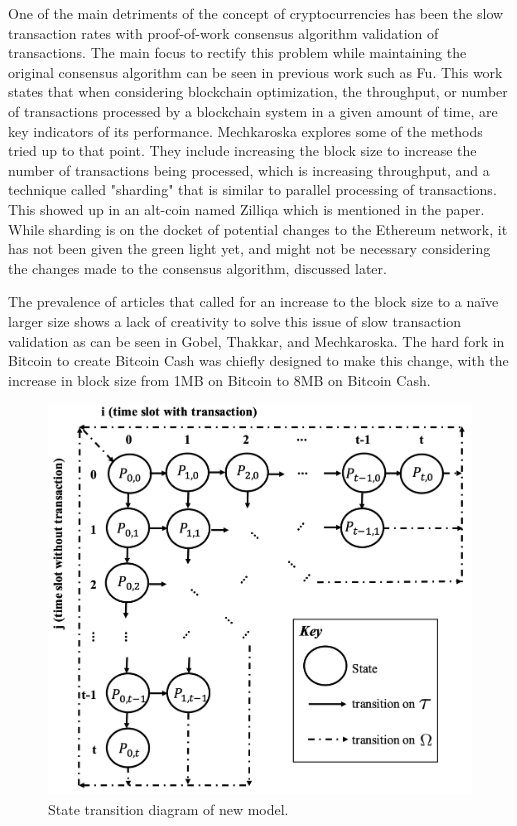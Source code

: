 \documentclass[conference]{IEEEtran}
\begin{document}
One of the main detriments of the concept of cryptocurrencies has been the slow transaction
rates with proof-of-work consensus algorithm validation of transactions. The main focus to rectify 
this problem while maintaining the original consensus algorithm can be seen in previous work such 
as Fu\cite{2020_IEEEToVT_Fu}. This work states that when considering blockchain optimization, 
the throughput, or number of transactions processed by a blockchain system in a given amount of 
time, are key indicators of its performance. Mechkaroska\cite{2018_TELFOR_Mechkaroska} explores
some of the methods tried up to that point. They include increasing the block size to increase the 
number of transactions being processed, which is increasing throughput, and a technique called 
"sharding" that is similar to parallel processing of transactions. This showed up in an alt-coin named 
Zilliqa\cite{2017_Zilliqa_Zilliqa} which is mentioned in the paper. While sharding is on the docket of 
potential changes to the Ethereum network, it has not been given the green light yet, and might not
be necessary considering the changes made to the consensus algorithm, discussed later.

The prevalence of articles that called for an increase to the block size to a na\"ive larger size shows 
a lack of creativity to solve this issue of slow transaction validation as can be seen in Gobel, Thakkar, 
and Mechkaroska\cite{2017_IEEE_Gobel, 2018_IEEE_Thakkar, 2018_TELFOR_Mechkaroska}. The 
hard fork in Bitcoin to create Bitcoin Cash was chiefly designed to make this change, with the increase 
in block size from 1MB on Bitcoin to 8MB on Bitcoin Cash. 

\begin{figure}[htbp]
    \centerline{\includegraphics[width=\textwidth]{Figures/Flow}}
    \caption{State transition diagram of new model.} 
    \label{flow}
\end{figure}	
\end{document}
